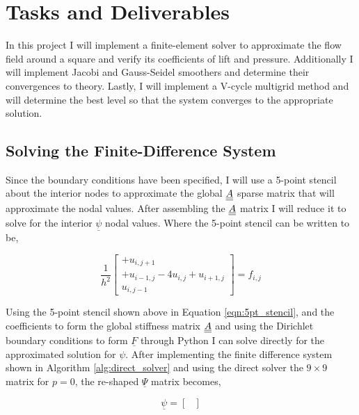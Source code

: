 \pagebreak
\section{Tasks and Deliverables}
In this project I will implement a finite-element solver to approximate the flow field
around a square and verify its coefficients of lift and pressure. Additionally I will implement Jacobi and Gauss-Seidel smoothers and determine their convergences to theory. Lastly, I will implement a V-cycle multigrid method and will determine the best level so that the system converges to the appropriate solution.

\subsection{Solving the Finite-Difference System}
Since the boundary conditions have been specified, I will use a 5-point stencil about the interior nodes to approximate the global $\underline{\underline{A}}$ sparse matrix that will approximate the nodal values. After assembling the $\underline{\underline{A}}$ matrix I will reduce it to solve for the interior $\underline{\psi}$ nodal values. Where the 5-point stencil can be written to be,

\begin{equation}
    \frac{1}{h^2} \begin{bmatrix}
        +u_{i,j+1}\\
        + u_{i-1,j} - 4u_{i,j} + u_{i+1,j}\\
        u_{i,j-1}
    \end{bmatrix} = f_{i,j}
    \label{eqn:5pt_stencil}
\end{equation}

Using the 5-point stencil shown above in Equation \ref{eqn:5pt_stencil}, and the coefficients to form the global stiffness matrix $\underline{\underline{A}}$ and using the Dirichlet boundary conditions to form $\underline{F}$ through Python I can solve directly for the approximated solution for $\psi$. After implementing the finite difference system shown in Algorithm \ref{alg:direct_solver} and using the direct solver the $9\times 9$ matrix for $p=0$, the re-shaped $\underline{\Psi}$ matrix becomes,

\begin{equation*}
    \boxed{
    \underline{\psi} = 
    \begin{bmatrix}
        
    \end{bmatrix}}
\end{equation*}
